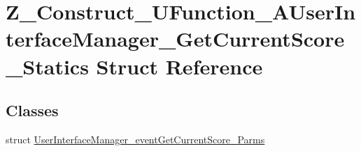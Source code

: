 \hypertarget{struct_z___construct___u_function___a_user_interface_manager___get_current_score___statics}{}\section{Z\+\_\+\+Construct\+\_\+\+U\+Function\+\_\+\+A\+User\+Interface\+Manager\+\_\+\+Get\+Current\+Score\+\_\+\+Statics Struct Reference}
\label{struct_z___construct___u_function___a_user_interface_manager___get_current_score___statics}
\subsection*{Classes}
\begin{DoxyCompactItemize}
\item 
struct \mbox{\hyperlink{struct_z___construct___u_function___a_user_interface_manager___get_current_score___statics_1_1_u037d1197953daf6466aa6ebf222cb735}{User\+Interface\+Manager\+\_\+event\+Get\+Current\+Score\+\_\+\+Parms}}
\end{DoxyCompactItemize}
